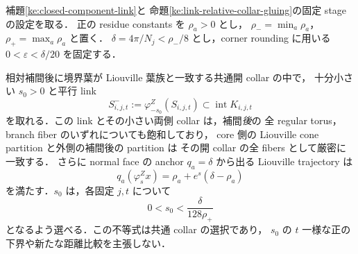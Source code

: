 \begin{lemma}
\label{ke:post-interpolation-parallel-link}
補題\ref{ke:closed-component-link}と
命題\ref{ke:link-relative-collar-gluing}の固定 stage の設定を取る．
正の residue constants を $\rho_a>0$ とし，
$\rho_-=\min_a\rho_a$，$\rho_+=\max_a\rho_a$ と置く．
$\delta=4\pi/N_j<\rho_-/8$ とし，corner rounding に用いる
$0<\varepsilon<\delta/20$ を固定する．

相対補間後に境界葉が Liouville 葉族と一致する共通開 collar の中で，
十分小さい $s_0>0$ と平行 link
\[
 S^-_{i,j,t}:=\varphi_{-s_0}^Z(S_{i,j,t})
       \subset\operatorname{int}K_{i,j,t}
\]
を取れる．この link とその小さい両側 collar は，補間\emph{後}の
全 regular torus，branch fiber のいずれについても飽和しており，
core 側の Liouville cone partition と外側の補間後の partition は
その開 collar の全 fibers として厳密に一致する．
さらに normal face の anchor $q_a=\delta$ から出る Liouville trajectory は
\begin{equation}\label{ke:eq:post-interpolation-parallel-moment}
 q_a(\varphi_s^Zx)
  =\rho_a+e^s(\delta-\rho_a)
\end{equation}
を満たす．$s_0$ は，各固定 $j,t$ について
\[
 0<s_0<\frac{\delta}{128\rho_+}
\]
となるよう選べる．この不等式は共通 collar の選択であり，
$s_0$ の $t$ 一様な正の下界や新たな距離比較を主張しない．
\end{lemma}

